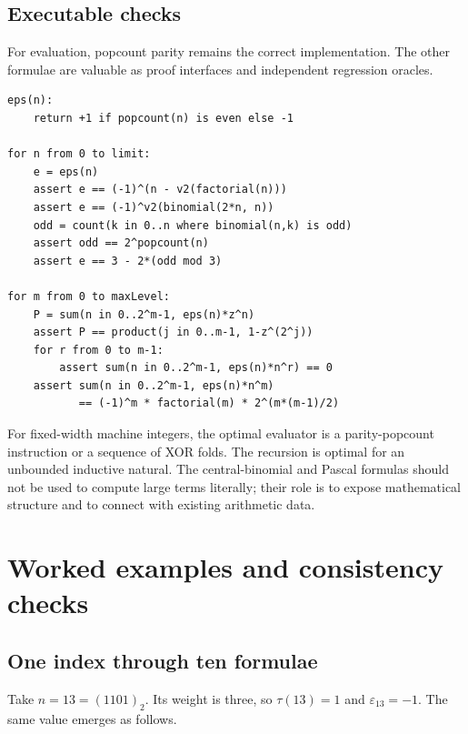 \documentclass[11pt,oneside]{article}
\theoremstyle{definition}
\theoremstyle{remark}
\newcommand{\eps}{\varepsilon}
\begin{document}
\subsection{Executable checks}

For evaluation, popcount parity remains the correct implementation.  The other formulae are
valuable as proof interfaces and independent regression oracles.

\begin{lstlisting}[style=pseudo,caption={Cross-checking independent formula families}]
eps(n):
    return +1 if popcount(n) is even else -1

for n from 0 to limit:
    e = eps(n)
    assert e == (-1)^(n - v2(factorial(n)))
    assert e == (-1)^v2(binomial(2*n, n))
    odd = count(k in 0..n where binomial(n,k) is odd)
    assert odd == 2^popcount(n)
    assert e == 3 - 2*(odd mod 3)

for m from 0 to maxLevel:
    P = sum(n in 0..2^m-1, eps(n)*z^n)
    assert P == product(j in 0..m-1, 1-z^(2^j))
    for r from 0 to m-1:
        assert sum(n in 0..2^m-1, eps(n)*n^r) == 0
    assert sum(n in 0..2^m-1, eps(n)*n^m)
           == (-1)^m * factorial(m) * 2^(m*(m-1)/2)
\end{lstlisting}

For fixed-width machine integers, the optimal evaluator is a parity-popcount instruction or a
sequence of XOR folds.  The recursion is optimal for an unbounded inductive natural.  The
central-binomial and Pascal formulas should not be used to compute large terms literally;
their role is to expose mathematical structure and to connect with existing arithmetic data.

\section{Worked examples and consistency checks}
\label{sec:examples}

\subsection{One index through ten formulae}

Take \(n=13=(1101)_2\).  Its weight is three, so \(\tau(13)=1\) and \(\eps_{13}=-1\).
The same value emerges as follows.
\end{document}
